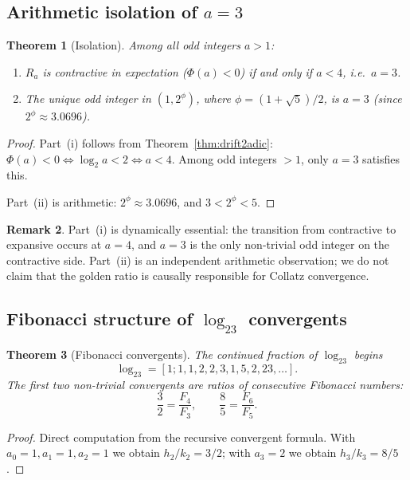 \documentclass[12pt,reqno]{amsart}
\theoremstyle{plain}
\newtheorem{theorem}{Theorem}[section]
\theoremstyle{definition}
\newtheorem{remark}[theorem]{Remark}
\newcommand{\logtwo}{\log_2}
\newcommand{\PhiDrift}{\Phi}
\begin{document}
\subsection{Arithmetic isolation of $a=3$}

\begin{theorem}[Isolation]\label{thm:isolation}
Among all odd integers $a > 1$:
\begin{enumerate}
\item[(i)] $R_a$ is contractive in expectation ($\PhiDrift(a) < 0$) if and only if $a < 4$,
i.e.~$a = 3$.
\item[(ii)] The unique odd integer in $(1, 2^\phi)$, where $\phi = (1+\sqrt{5})/2$,
is $a = 3$ (since $2^\phi \approx 3.0696$).
\end{enumerate}
\end{theorem}

\begin{proof}
Part~(i) follows from Theorem~\ref{thm:drift2adic}:
$\PhiDrift(a) < 0 \iff \logtwo a < 2 \iff a < 4$.
Among odd integers $>1$, only $a=3$ satisfies this.

Part~(ii) is arithmetic: $2^\phi \approx 3.0696$, and $3 < 2^\phi < 5$.
\end{proof}

\begin{remark}
Part~(i) is dynamically essential: the transition from contractive to expansive
occurs at $a=4$, and $a=3$ is the only non-trivial odd integer on the
contractive side. Part~(ii) is an independent arithmetic observation; we do not
claim that the golden ratio is causally responsible for Collatz convergence.
\end{remark}

\subsection{Fibonacci structure of $\logtwo 3$ convergents}

\begin{theorem}[Fibonacci convergents]\label{thm:fibonacci}
The continued fraction of $\logtwo 3$ begins
\[
\logtwo 3 = [1; 1, 1, 2, 2, 3, 1, 5, 2, 23, \dots].
\]
The first two non-trivial convergents are ratios of consecutive Fibonacci numbers:
\[
\frac{3}{2} = \frac{F_4}{F_3}, \qquad \frac{8}{5} = \frac{F_6}{F_5}.
\]
\end{theorem}

\begin{proof}
Direct computation from the recursive convergent formula.
With $a_0=1, a_1=1, a_2=1$ we obtain $h_2/k_2 = 3/2$;
with $a_3=2$ we obtain $h_3/k_3 = 8/5$.
\end{proof}
\end{document}
